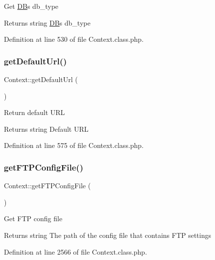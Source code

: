 Get \hyperlink{classDB}{DB}\textquotesingle{}s db\+\_\+type

\begin{DoxyReturn}{Returns}
string \hyperlink{classDB}{DB}\textquotesingle{}s db\+\_\+type 
\end{DoxyReturn}


Definition at line 530 of file Context.\+class.\+php.

\hypertarget{classContext_abf99203a93b0b0de0da3fbeced6ce333}{}\label{classContext_abf99203a93b0b0de0da3fbeced6ce333} 
\subsubsection{\texorpdfstring{get\+Default\+Url()}{getDefaultUrl()}}
{\footnotesize\ttfamily Context\+::get\+Default\+Url (\begin{DoxyParamCaption}{ }\end{DoxyParamCaption})}

Return default U\+RL

\begin{DoxyReturn}{Returns}
string Default U\+RL 
\end{DoxyReturn}


Definition at line 575 of file Context.\+class.\+php.

\hypertarget{classContext_ab7bb799f55be29174c8a15659dab823a}{}\label{classContext_ab7bb799f55be29174c8a15659dab823a} 
\subsubsection{\texorpdfstring{get\+F\+T\+P\+Config\+File()}{getFTPConfigFile()}}
{\footnotesize\ttfamily Context\+::get\+F\+T\+P\+Config\+File (\begin{DoxyParamCaption}{ }\end{DoxyParamCaption})}

Get F\+TP config file

\begin{DoxyReturn}{Returns}
string The path of the config file that contains F\+TP settings 
\end{DoxyReturn}


Definition at line 2566 of file Context.\+class.\+php.

